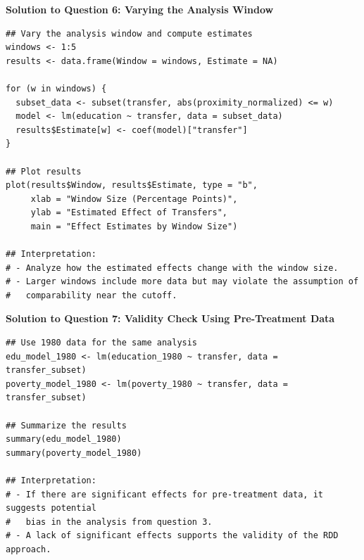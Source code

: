 \documentclass[12pt]{article}
\begin{document}
{\textbf{Solution to Question 6: Varying the Analysis Window}
\begin{verbatim}
## Vary the analysis window and compute estimates
windows <- 1:5
results <- data.frame(Window = windows, Estimate = NA)

for (w in windows) {
  subset_data <- subset(transfer, abs(proximity_normalized) <= w)
  model <- lm(education ~ transfer, data = subset_data)
  results$Estimate[w] <- coef(model)["transfer"]
}

## Plot results
plot(results$Window, results$Estimate, type = "b",
     xlab = "Window Size (Percentage Points)",
     ylab = "Estimated Effect of Transfers",
     main = "Effect Estimates by Window Size")

## Interpretation:
# - Analyze how the estimated effects change with the window size.
# - Larger windows include more data but may violate the assumption of
#   comparability near the cutoff.
\end{verbatim}

\textbf{Solution to Question 7: Validity Check Using Pre-Treatment Data}
\begin{verbatim}
## Use 1980 data for the same analysis
edu_model_1980 <- lm(education_1980 ~ transfer, data = transfer_subset)
poverty_model_1980 <- lm(poverty_1980 ~ transfer, data = transfer_subset)

## Summarize the results
summary(edu_model_1980)
summary(poverty_model_1980)

## Interpretation:
# - If there are significant effects for pre-treatment data, it suggests potential
#   bias in the analysis from question 3.
# - A lack of significant effects supports the validity of the RDD approach.
\end{verbatim}
}
\fi
\end{document}

